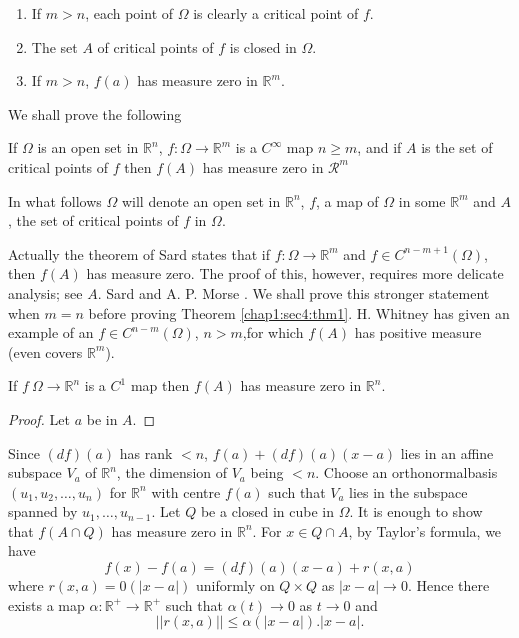 \begin{remark*}
  \begin{enumerate}[(1)]
  \item If $m > n$, each point of $\Omega$ is clearly a critical point
    of $f$.  
  \item The set $A$ of critical points of $f$ is closed in $\Omega$. 
  \item If $m > n$, $f(a)$ has measure zero in $\mathbb{R}^m$. 
  \end{enumerate}
  We shall prove the following 
\end{remark*}

\setcounter{theorem}{0}
\begin{theorem}[Sard]\label{chap1:sec4:thm1} %
  If $\Omega$ is an open set in $\mathbb{R}^n$, $f: \Omega \to
  \mathbb{R}^m$ is a $C^\infty$ map $n \geq m$, and if $A$ is the set
  of critical points of $f$ then $f(A)$ has measure zero in
  $\mathscr{R}^m$ 
\end{theorem}

In what follows $\Omega$ will denote an open set in $\mathbb{R}^n$, $f$, a
map of $\Omega$ in some $\mathbb{R}^m$ and $A$, the set of critical
points of $f$ in $\Omega$.  

Actually the theorem of Sard states that if $f:\Omega \to
\mathbb{R}^m$ and $f \in C^{ n - m +1}(\Omega)$, then $f(A)$ has
measure zero. The proof of this, however, requires more delicate
analysis; see $A$. Sard \cite{38} and A. P. Morse \cite{30}. We shall prove
this stronger statement when $m = n$ before proving
Theorem \ref{chap1:sec4:thm1}. 
H. Whitney \cite{46}  has given an example of an $f \in C^{ n -m}
(\Omega)$, $n > m$,\pageoriginale for which $f(A)$ has positive measure (even
covers $\mathbb{R}^m$).  

\setcounter{proposition}{0}
\begin{proposition}\label{chap1:sec4:prop1}%
  If $f ~ \Omega \to \mathbb{R}^n$ is a $C^1$ map then $f(A)$ has
  measure zero in $\mathbb{R}^n$. 
\end{proposition}

\begin{proof}%
  Let $a$ be in $A$. 
\end{proof}

Since $(df)(a)$ has rank $< n $, $f(a) + (df)(a)(x- a)$ lies in an
affine subspace $V_a$ of $\mathbb{R}^n$, the dimension of $V_a$ being
$<n$. Choose an orthonormal\pageoriginale basis $(u_1, u_2, \ldots, u_n)$ for
$\mathbb{R}^n$ with centre $f(a)$ such that $V_a$ lies in the subspace
spanned by $u_1, \ldots , u_{ n - 1}$. Let $Q$ be a closed in cube in
$\Omega$. It is enough to show that $f (A \cap Q)$ has measure zero in
$\mathbb{R}^n$. For $x \in Q \cap A$, by Taylor's formula, we have 
$$
f(x) - f(a)= (df) (a) (x -a) + r (x, a)
$$
where $r (x, a) = 0 (|x -a|)$ uniformly on $Q \times Q$ as $| x- a |
\to 0$. Hence there exists a map $\alpha: \mathbb{R}^+ \to \mathbb{R}^+
$ such that $\alpha (t) \to 0$ as $t \to 0$ and  
$$
|| r (x , a) ||\leq \alpha (|x - a|). | x - a|. 
$$

